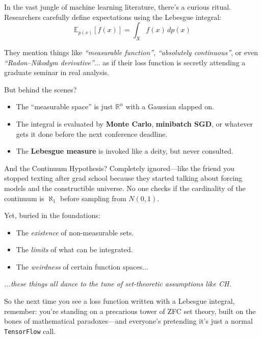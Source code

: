 \begin{tcolorbox}[title={\faBookmark\hspace{0.5em}Sidebar: The Continuum Hypothesis and the Great ML Handwave}, colback=gray!5, colframe=black, fonttitle=\bfseries]
  In the vast jungle of machine learning literature, there's a curious ritual.  Researchers carefully define expectations using the Lebesgue integral:
  \[
  \mathbb{E}_{p(x)}[f(x)] = \int_X f(x)\, dp(x)
  \]

  \medskip

  They mention things like \emph{“measurable function”}, \emph{“absolutely continuous”}, or even \emph{“Radon–Nikodym derivative”}... as if their loss function is secretly attending a graduate seminar in real analysis.

  \medskip
  
  But behind the scenes?

  \medskip

  \begin{itemize}
    \item The “measurable space” is just \(\mathbb{R}^n\) with a Gaussian slapped on.
    \item The integral is evaluated by \textbf{Monte Carlo}, \textbf{minibatch SGD}, or whatever gets it done before the next conference deadline.
    \item The \textbf{Lebesgue measure} is invoked like a deity, but never consulted.
  \end{itemize}

  \medskip
  
  And the Continuum Hypothesis?  Completely ignored—like the friend you stopped texting after grad school because they started talking about forcing models and the constructible universe. No one checks if the cardinality of the continuum is \(\aleph_1\) before sampling from \(N(0,1)\).

  \medskip
  
  Yet, buried in the foundations:

  \medskip

  \begin{itemize}
    \item The \emph{existence} of non-measurable sets.
    \item The \emph{limits} of what can be integrated.
    \item The \emph{weirdness} of certain function spaces...
  \end{itemize}

  \medskip
  
  \emph{...these things all dance to the tune of set-theoretic assumptions like CH.}

  \medskip
  
  So the next time you see a loss function written with a Lebesgue integral, remember: you're standing on a precarious tower of ZFC set theory, built on the bones of mathematical paradoxes—and everyone’s pretending it’s just a normal \texttt{TensorFlow} call.
  \end{tcolorbox}







